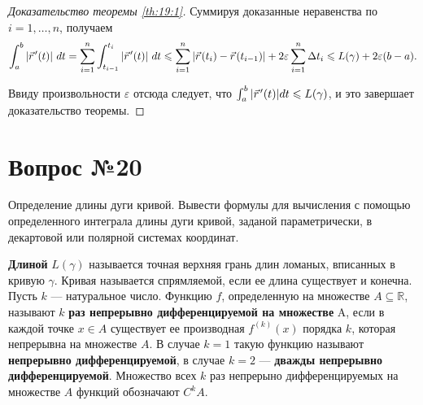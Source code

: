 \documentclass[12pt]{report}
\numberwithin{equation}{section}
\newcommand{\pvec}[1]{\vec{#1}\mkern2mu\vphantom{#1}}
\begin{document}
\begin{proof} [Доказательство теоремы \ref{th:19:1}]
Суммируя доказанные неравенства по $i = 1, \ldots, n$, получаем
\[\int_a^b |\pvec{r}' (t)| ~dt = \sum_{i=1}^n \int_{t_{i-1}}^{t_i} |\pvec{r}'(t)| ~dt \leqslant \sum_{i=1}^n |\pvec{r}(t_i) - \pvec{r}(t_{i-1}) | + 2 \varepsilon \sum_{i=1}^n \Delta t_i \leqslant L(\gamma) + 2 \varepsilon (b-a).\]

Ввиду произвольности $\varepsilon$ отсюда следует, что $\int_a^b |\pvec{r}'(t)|dt \leqslant L(\gamma)$, и это завершает доказательство теоремы.
\end{proof}

\newpage \section{Вопрос №20} %
\begin{framed}
Определение длины дуги кривой. Вывести формулы для вычисления с помощью определенного интеграла длины дуги кривой, заданой параметрически, в декартовой или полярной системах координат.
\end{framed}

\textbf{Длиной} $L(\gamma)$ называется точная верхняя грань длин ломаных, вписанных в кривую $\gamma$. Кривая называется спрямляемой, если ее длина существует и конечна.\\

Пусть $k$ --- натуральное число. Функцию $f$, определенную на множестве  $A \subseteq \mathbb{R}$, называют $k$ \textbf{раз непрерывно дифференцируемой на множестве} A, если в каждой точке $x \in A$ существует ее производная $f^{(k)} (x)$ порядка $k$, которая непрерывна на множестве $A$. В случае $k = 1$ такую функцию называют \textbf{непрерывно дифференцируемой}, в случае $k = 2$ --- \textbf{дважды непрерывно дифференцируемой}. Множество всех $k$ раз непрерыно дифференцируемых на множестве $A$ функций обозначают $C^k A$.
\end{document}
